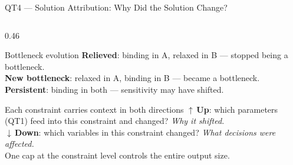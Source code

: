 \documentclass[aspectratio=169,10pt]{beamer}
\begin{document}
\begin{frame}[t]{QT4 — Solution Attribution: Why Did the Solution Change?}
\begin{columns}[T]
\begin{column}{0.46\textwidth}
\begin{block}{Bottleneck evolution}
      \textcolor{lgrn}{\textbf{Relieved}}: binding in A, relaxed in B
      — stopped being a bottleneck.\\[3pt]
      \textcolor{ared}{\textbf{New bottleneck}}: relaxed in A, binding in B
      — became a bottleneck.\\[3pt]
      \textcolor{aorng}{\textbf{Persistent}}: binding in both
      — sensitivity may have shifted.
    \end{block}
    \vspace{5pt}
    \begin{block}{Each constraint carries context in both directions}
      \small
      \textcolor{aorng}{$\uparrow$\,\textbf{Up}}: which parameters
      (QT1) feed into this constraint and changed?
      \emph{Why it shifted.}\\[3pt]
      \textcolor{purp}{$\downarrow$\,\textbf{Down}}: which variables
      in this constraint changed?
      \emph{What decisions were affected.}\\[3pt]
      One cap at the constraint level controls the
      entire output size.
    \end{block}
  \end{column}
\end{columns}
\end{frame}
\end{document}
